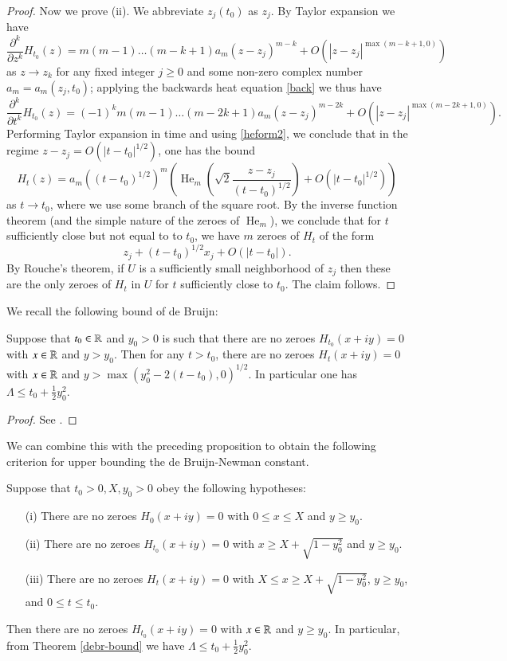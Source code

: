 \begin{proof}
Now we prove (ii).  We abbreviate $z_j(t_0)$ as $z_j$.  By Taylor expansion we have
$$ \frac{\partial^k}{\partial z^k} H_{t_0}(z) = m (m-1) \dots (m-k+1) a_m (z-z_j)^{m-k} + O( |z-z_j|^{\max(m-k+1,0)} )$$
as $z \to z_k$ for any fixed integer $j \geq 0$ and some non-zero complex number $a_m = a_m(z_j, t_0)$; applying the backwards heat equation \eqref{back} we thus have
$$ \frac{\partial^k}{\partial t^k} H_{t_0}(z) = (-1)^k m (m-1) \dots (m-2k+1) a_m (z-z_j)^{m-2k} + O( |z-z_j|^{\max(m-2k+1,0)} ).$$
Performing Taylor expansion in time and using \eqref{heform2}, we conclude that in the regime $z - z_j = O( |t-t_0|^{1/2} )$, one has the bound
$$ H_t(z) = a_m ((t-t_0)^{1/2})^m \left( \operatorname{He}_m\left( \sqrt{2} \frac{z-z_j}{(t-t_0)^{1/2}} \right) + O\left( |t-t_0|^{1/2} \right) \right)$$
as $t \to t_0$, where we use some branch of the square root.  By the inverse function theorem (and the simple nature of the zeroes of $\operatorname{He}_m$), we conclude that for $t$ sufficiently close but not equal to to $t_0$, we have $m$ zeroes of $H_t$ of the form
$$ z_j + (t-t_0)^{1/2} x_j + O( |t-t_0| ).$$
By Rouche's theorem, if $U$ is a sufficiently small neighborhood of $z_j$ then these are the only zeroes of $H_t$ in $U$ for $t$ sufficiently close to $t_0$.  The claim follows.
\end{proof}

We recall the following bound of de Bruijn:

\begin{theorem}\label{debr-bound}  Suppose that $t_0 \in \mathbb{R}$ and $y_0 > 0$ is such that there are no zeroes $H_{t_0}(x+iy)=0$ with $x \in \mathbb{R}$ and $y > y_0$.  Then for any $t>t_0$, there are no zeroes $H_{t}(x+iy)=0$ with $x \in \mathbb{R}$ and $y > \max( y_0^2 - 2(t-t_0), 0)^{1/2}$.  In particular one has $\Lambda \leq t_0 + \frac{1}{2} y_0^2$.
\end{theorem}

\begin{proof} See \cite[Theorem 13]{debr}.
\end{proof}

We can combine this with the preceding proposition to obtain the following criterion for upper bounding the de Bruijn-Newman constant.

\begin{theorem}\label{ubc}  Suppose that $t_0 > 0, X, y_0 > 0$ obey the following hypotheses:
\begin{itemize}
\item[(i)]  There are no zeroes $H_0(x+iy)=0$ with $0 \leq x \leq X$ and $y \geq y_0$.
\item[(ii)]  There are no zeroes $H_{t_0}(x+iy)=0$ with $x \geq X+\sqrt{1-y_0^2}$ and $y \geq y_0$.
\item[(iii)]  There are no zeroes $H_{t}(x+iy)=0$ with $X \leq x \geq X+\sqrt{1-y_0^2}$, $y \geq y_0$, and $0 \leq t \leq t_0$.
\end{itemize}
Then there are no zeroes $H_{t_0}(x+iy)=0$ with $x \in \mathbb{R}$ and $y \geq y_0$.  In particular, from Theorem \ref{debr-bound}
we have $\Lambda \leq t_0 + \frac{1}{2} y_0^2$.
\end{theorem}

